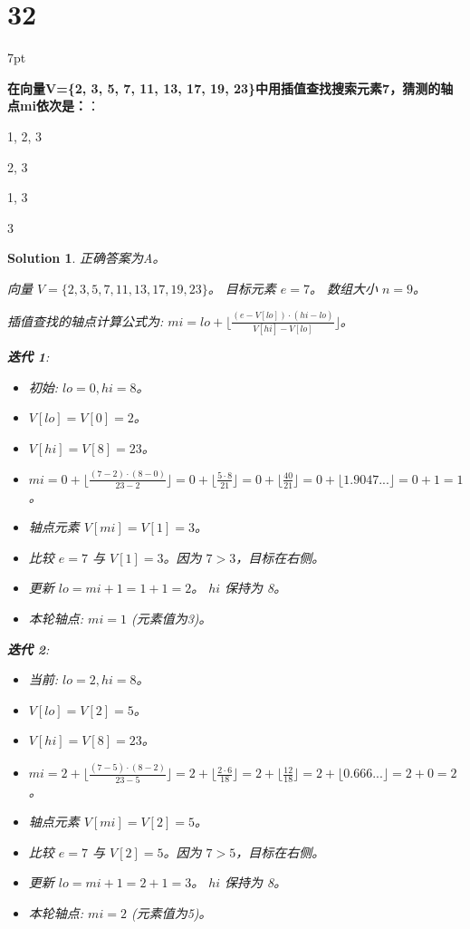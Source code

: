 \documentclass[UTF8]{report}
\newtheorem{solution}{Solution}
\theoremstyle{MyLineTheoremStyle} %
\theoremstyle{MyBlockTheoremStyle} %
\theoremstyle{MySubsubsectionStyle} %
\newenvironment{graybox}{%
        \def\FrameCommand{%
        \hspace{1pt}%
        {\color{gray}\small \vrule width 2pt}%
        {\color{graybox_color}\vrule width 4pt}%
        \colorbox{graybox_color}%
        }%
        \MakeFramed{\advance\hsize-\width\FrameRestore}%
        \noindent\hspace{-4.55pt}%
        \begin{adjustwidth}{}{7pt}%
        \vspace{2pt}\vspace{2pt}%
        }
        {%
        \vspace{2pt}\end{adjustwidth}\endMakeFramed%
        }
\begin{document}
\section*{32}

\begin{graybox}
\textbf{在向量V=\{2, 3, 5, 7, 11, 13, 17, 19, 23\}中用插值查找搜索元素7，猜测的轴点mi依次是：}：
\begin{circledenum}
    \item 1, 2, 3
    \item 2, 3
    \item 1, 3
    \item 3
\end{circledenum}
\end{graybox}

\begin{solution}
正确答案为A。

向量 $V = \{2, 3, 5, 7, 11, 13, 17, 19, 23\}$。
目标元素 $e = 7$。
数组大小 $n=9$。

插值查找的轴点计算公式为: $mi = lo + \lfloor \frac{(e - V[lo]) \cdot (hi - lo)}{V[hi] - V[lo]} \rfloor$。

\textbf{迭代 1}:
\begin{itemize}
    \item 初始: $lo = 0, hi = 8$。
    \item $V[lo] = V[0] = 2$。
    \item $V[hi] = V[8] = 23$。
    \item $mi = 0 + \lfloor \frac{(7 - 2) \cdot (8 - 0)}{23 - 2} \rfloor = 0 + \lfloor \frac{5 \cdot 8}{21} \rfloor = 0 + \lfloor \frac{40}{21} \rfloor = 0 + \lfloor 1.9047... \rfloor = 0 + 1 = 1$。
    \item 轴点元素 $V[mi] = V[1] = 3$。
    \item 比较 $e=7$ 与 $V[1]=3$。因为 $7 > 3$，目标在右侧。
    \item 更新 $lo = mi + 1 = 1 + 1 = 2$。 $hi$ 保持为 8。
    \item 本轮轴点: $mi=1$ (元素值为3)。
\end{itemize}

\textbf{迭代 2}:
\begin{itemize}
    \item 当前: $lo = 2, hi = 8$。
    \item $V[lo] = V[2] = 5$。
    \item $V[hi] = V[8] = 23$。
    \item $mi = 2 + \lfloor \frac{(7 - 5) \cdot (8 - 2)}{23 - 5} \rfloor = 2 + \lfloor \frac{2 \cdot 6}{18} \rfloor = 2 + \lfloor \frac{12}{18} \rfloor = 2 + \lfloor 0.666... \rfloor = 2 + 0 = 2$。
    \item 轴点元素 $V[mi] = V[2] = 5$。
    \item 比较 $e=7$ 与 $V[2]=5$。因为 $7 > 5$，目标在右侧。
    \item 更新 $lo = mi + 1 = 2 + 1 = 3$。 $hi$ 保持为 8。
    \item 本轮轴点: $mi=2$ (元素值为5)。
\end{itemize}


\end{solution}
\end{document}
